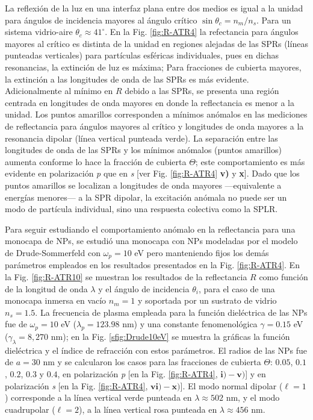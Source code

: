 \documentclass[letterpaper,11pt] {article}
\begin{document}
La reflexión de la luz en una interfaz plana entre dos medios es igual a la unidad para ángulos de incidencia mayores al ángulo crítico $\sin\theta_c = n_m/n_s$.  Para un sistema vidrio-aire $\theta_c\approx 41^\circ$.  En la Fig.  \ref{fig:R-ATR4} la refectancia para ángulos mayores al crítico es distinta de la unidad en regiones alejadas de las SPRs (líneas punteadas verticales) para partículas esféricas individuales, pues en dichas resonancias, la extinción de luz es máxima; Para fracciones de cubierta mayores, la extinción a las longitudes de onda de las SPRs es más evidente.  Adicionalmente al mínimo en $R$ debido a las SPRs, se presenta una región centrada en longitudes de onda mayores en donde la reflectancia es menor a la unidad.  Los puntos amarillos corresponden a mínimos anómalos en las mediciones de reflectancia para ángulos mayores al crítico y longitudes de onda mayores a la resonancia dipolar (línea vertical punteada verde).  La separación entre las longitudes de onda de las SPRs y los mínimos anómalos (puntos amarillos) aumenta conforme lo hace la fracción de cubierta $\Theta$; este comportamiento es más evidente en polarización \emph{p} que en \emph{s} [ver  Fig.  \ref{fig:R-ATR4} \textbf{v)} y \textbf{x}].  Dado que los puntos amarillos se localizan a longitudes de onda mayores ---equivalente a energías menores--- a la SPR dipolar, la excitación anómala no puede ser un modo de partícula individual, sino una respuesta colectiva como la SPLR. 

Para seguir estudiando el comportamiento anómalo en la reflectancia para una monocapa de NPs, se estudió una monocapa con NPs modeladas por el modelo de Drude-Sommerfeld con $\omega_p = 10$ eV pero manteniendo fijos los demás parámetros empleados en los resultados presentados en la Fig.  \ref{fig:R-ATR4}.  En la Fig.  \ref{fig:R-ATR10} se muestran los resultados de la reflectancia $R$ como función de la longitud de onda $\lambda$ y el ángulo de incidencia $\theta_i$, para el caso de una monocapa inmersa en vacío $n_m= 1$ y soportada por un sustrato de vidrio $n_s = 1. 5$.  La frecuencia de plasma empleada para la función dieléctrica de las NPs fue de $\omega_p = 10$ eV ($\lambda_p=123. 98$ nm) y una constante  fenomenológica $\gamma = 0. 15$ eV ($\gamma_\lambda=8,270$ nm); en la Fig.  \ref{sfig:Drude10eV} se muestra la gráficas la función dieléctrica y el índice de refracción con estos parámetros.  El radios de las NPs fue de $a=30$ nm y se calcularon los casos para las fracciones de cubierta $\Theta$: $0. 05$, $0. 1$, $0. 2$, $0. 3$ y $0. 4$, en polarización \emph{p} [en la Fig.  \ref{fig:R-ATR4}, $\mathbf{i)-v)}$] y en polarización \emph{s} [en la Fig.  \ref{fig:R-ATR4}, $\mathbf{vi)-x)}$].   El modo normal dipolar ($\ell=1$) corresponde a la línea vertical verde punteada en $\lambda \approx 502$ nm, y el modo cuadrupolar ($\ell=2$), a la línea vertical rosa punteada en $\lambda \approx 456$ nm. 
	
\end{document}
